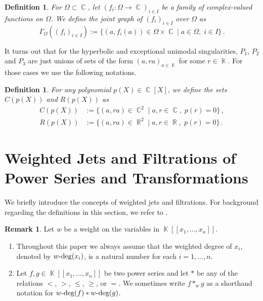 \documentclass[noend]{amsproc}
\newtheorem{defn}[theorem]{Definition}
\theoremstyle{definition}
\newtheorem{remark}[theorem]{Remark}
\DeclareMathOperator{\R}{\mathbb{R}}
\DeclareMathOperator{\C}{\mathbb{C}}
\DeclareMathOperator{\K}{\mathbb{K}}
\DeclareMathOperator{\dash}{\!\textnormal{-}\!}
\begin{document}
\begin{defn}
For $\Omega \subset \C$, let $(f_i: \Omega \rightarrow \C)_{i \in I}$ be a
family of complex-valued functions on $\Omega$. We define the joint graph of
$(f_i)_{i \in I}$ over $\Omega$ as
\[
\Gamma_\Omega((f_i)_{i \in I})
:= \{ (a, f_i(a)) \in \Omega \times \C \mid a\in \Omega,\; i \in I \}\,.
\]
\end{defn}

It turns out that for the hyperbolic and exceptional unimodal singularities,
$P_1$, $P_2$ and $P_3$ are just unions of sets of the form $(a, ra)_{a \in \K}$
for some $r \in \K$. For those cases we use the following notations.

\begin{defn}
For any polynomial $p(X) \in \C[X]$, we define the sets $C(p(X))$ and $R(p(X))$
as
\begin{align*}
C(p(X)) &:= \{ (a, ra) \in \C^2 \mid a, r \in \C, \; p(r) = 0 \} \,, \\
R(p(X)) &:= \{ (a, ra) \in \R^2 \mid a, r \in \R, \; p(r) = 0 \} \,.
\end{align*}
\end{defn}


\section{Weighted Jets and Filtrations of Power Series and Transformations}

We briefly introduce the concepts of weighted jets and filtrations. For
background regarding the definitions in this section, we refer to
\citet{A1974}.

\begin{remark}
Let $w$ be a weight on the variables in $\K[[x_1,\ldots,x_n]]$.

\begin{enumerate}
\item Throughout this paper we always assume that the weighted degree of $x_i$,
denoted by $w \dash \deg(x_i)$, is a natural number for each
$i = 1, \ldots, n$.

\item Let $f, g \in \K[[x_1,\ldots,x_n]]$ be two power series and let $*$ be
any of the relations $<$, $>$, $\leq$, $\geq$, or $=$. We sometimes write
$f *_w g$ as a shorthand notation for $w \dash \deg(f) * w \dash \deg(g)$.
\end{enumerate}
\end{remark}
\end{document}
